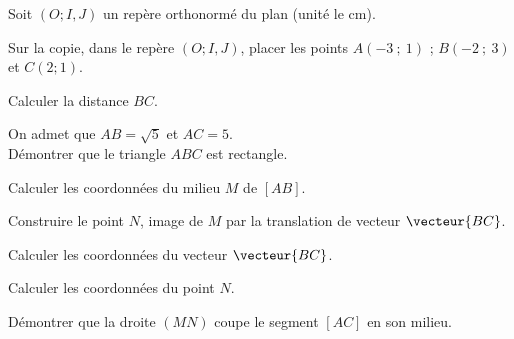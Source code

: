 Soit $(O; I, J)$ un repère orthonormé du plan (unité le cm).
\begin{myenumerate}
\item Sur la copie, dans le repère $(O; I, J)$, placer les points $A(-3~;~ 1)$ ;  $B(-2~;~ 3)$ et $C(2 ;  1)$.
\item Calculer la distance $BC$.
\item On admet que $AB=\sqrt5$ et $AC=5$.\\
Démontrer que le triangle $ABC$ est rectangle.
\item Calculer les coordonnées du milieu $M$ de $[AB]$.
\item Construire le point $N$, image de $M$ par la translation de vecteur $\vecteur{BC}$.
\item Calculer les coordonnées du vecteur $\vecteur{BC}$.
\item Calculer les coordonnées du point $N$.
\item Démontrer que la droite $(MN)$ coupe le segment $[AC]$ en son milieu.
\end{myenumerate}